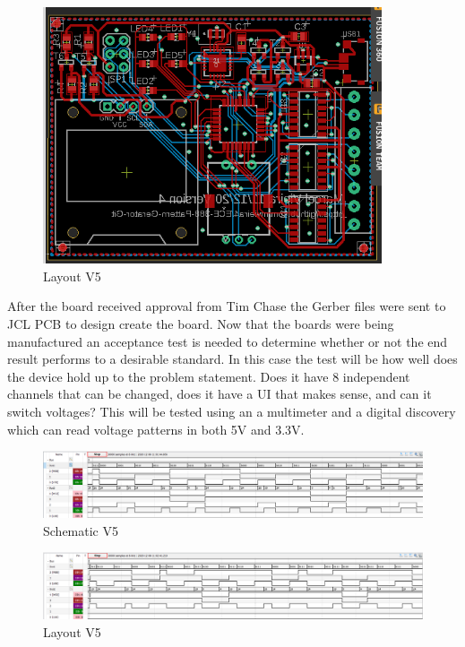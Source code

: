 \documentclass[12pt]{article}
\begin{document}
        \begin{figure}[htp]
            \centering
            \includegraphics[width=10cm]{LayoutV5.png}
            \caption{Layout V5}
        \end{figure}
        
        \newpage

        \par After the board received approval from Tim Chase the Gerber files were sent to JCL PCB to design create the board. Now that the boards were being manufactured an acceptance test is needed to determine whether or not the end result performs to a desirable standard. In this case the test will be how well does the device hold up to the problem statement. Does it have 8 independent channels that can be changed, does it have a UI that makes sense, and can it switch voltages? This will be tested using an a multimeter and a digital discovery which can read voltage patterns in both 5V and 3.3V.

        \begin{figure}[htp]
            \centering
            \includegraphics[width=15cm]{Waveform1.png}
            \caption{Schematic V5}
        \end{figure}
        
        \begin{figure}[htp]
            \centering
            \includegraphics[width=15cm]{Waveform2.png}
            \caption{Layout V5}
        \end{figure}
        
\end{document}
